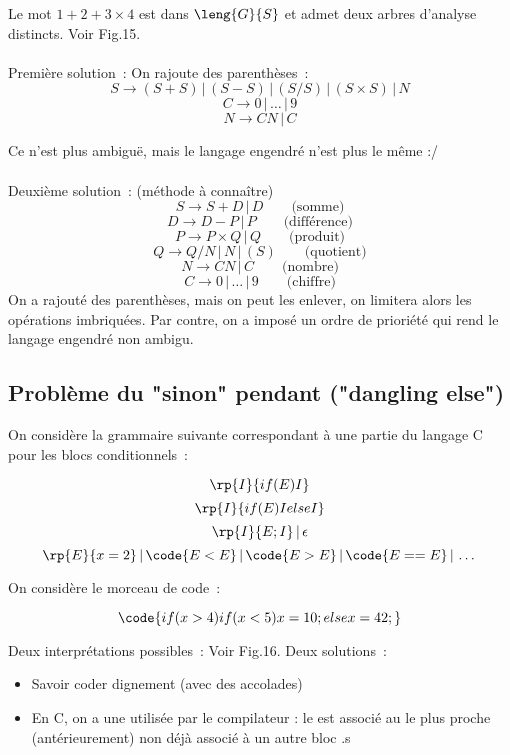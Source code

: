 \begin{adjustwidth}{-3cm}{-3cm}
Le mot  $1 + 2 + 3 \times 4$ est dans $\leng{G}{S}$ et admet deux arbres d'analyse distincts. Voir Fig.15.\\\\
Première solution~: On rajoute des parenthèses~:
$$S \rightarrow (S+S) \,\vert\, (S-S) \,\vert\, (S / S) \,\vert\, (S \times S) \,\vert\, N $$
$$C \rightarrow 0 \,\vert\, \dots \,\vert\, 9$$
$$N \rightarrow CN \,\vert\, C$$

Ce n'est plus ambiguë, mais le langage engendré n'est plus le même :/\\\\

Deuxième solution~: (méthode à connaître)
$$S \rightarrow S + D \,\vert\, D \qquad \text{(somme)}$$
$$D \rightarrow D - P \,\vert\, P \qquad \text{(différence)}$$
$$P \rightarrow P \times Q \,\vert\, Q \qquad \text{(produit)}$$
$$Q \rightarrow Q / N \,\vert\, N \,\vert\, (S)\qquad \text{(quotient)}$$
$$N \rightarrow CN \,\vert\, C \qquad \text{(nombre)}$$
$$C \rightarrow 0 \,\vert\, \dots \,\vert\, 9 \qquad \text{(chiffre)}$$
On a rajouté des parenthèses, mais on peut les enlever, on limitera alors les opérations imbriquées. Par contre, on a imposé un ordre de prioriété qui rend le langage engendré non ambigu.

\subsection{Problème du "sinon" pendant ("dangling else")}

On considère la grammaire suivante correspondant à une partie du langage C pour les blocs conditionnels~:

$$\rp{I}{if(E)I}$$
$$\rp{I}{if(E)I else I}$$
$$\rp{I}{E;I}\,\vert\, \epsilon$$
$$\rp{E}{x=2} \,\vert\, \code{E<E} \,\vert\, \code{E>E} \,\vert\, \code{E==E} \,\vert\, \dots$$

On considère le morceau de code~:

$$\code{if (x>4) if (x<5) x=10; else x=42;}$$

Deux interprétations possibles~: Voir Fig.16.
Deux solutions~:
\begin{itemize}
    \item Savoir coder dignement (avec des accolades)
    \item En C, on a une  utilisée par le compilateur : le  est associé au  le plus proche (antérieurement) non déjà associé à un autre bloc .s
\end{itemize}


\end{adjustwidth}
